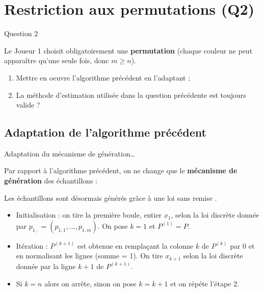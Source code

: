 \documentclass[10pt,xcolor=table,color={dvipsnames,usenames},ignorenonframetext,usepdftitle=false,french]{beamer}
\begin{document}
\hypertarget{restriction-aux-permutations-q2}{%
\section{Restriction aux permutations
(Q2)}\label{restriction-aux-permutations-q2}}

\begin{frame}{Question 2 \bccrayon}
\protect\hypertarget{question-2}{}

Le Joueur 1 choisit obligatoirement une \textbf{permutation} (chaque
couleur ne peut apparaître qu'une seule fois, donc \(m \geq n\)).

\begin{enumerate}
\item  Mettre en oeuvre l’algorithme précédent en l'adaptant ;
\item  La méthode d’estimation utilisée dans la question précédente
est toujours valide ? 
\end{enumerate}

\end{frame}

\hypertarget{adaptation-de-lalgorithme-pruxe9cuxe9dent}{%
\subsection{Adaptation de l'algorithme
précédent}\label{adaptation-de-lalgorithme-pruxe9cuxe9dent}}

\begin{frame}{Adaptation du mécanisme de génération\dots}
\protect\hypertarget{adaptation-du-muxe9canisme-de-guxe9nuxe9ration}{}

Par rapport à l'algorithme précédent, on ne change que le
\textbf{mécanisme de génération} des échantillons :

\pause

Les échantillons sont désormais générés grâce à une loi \og sans remise
\fg{}.

\begin{itemize}
\item Initialisation : on tire la première boule, entier $x_1$, selon la loi discrète donnée par $p_{1,\cdot} = (p_{1,1},\dots, p_{1,m})$. On pose $k=1$ et $P^{(1)} = P$.
\pause
\item Itération : $P^{(k+1)}$ est obtenue en remplaçant la colonne $k$ de $P^{(k)}$ par 0 et en normalisant les lignes (somme = 1). On tire $x_{k+1}$ selon la loi discrète donnée par la ligne $k+1$ de $P^{(k+1)}$. 
\pause
\item Si $k=n$ alors on arrête, sinon on pose $k=k+1$ et on répéte l'étape 2.
\end{itemize}

\end{frame}
\end{document}
